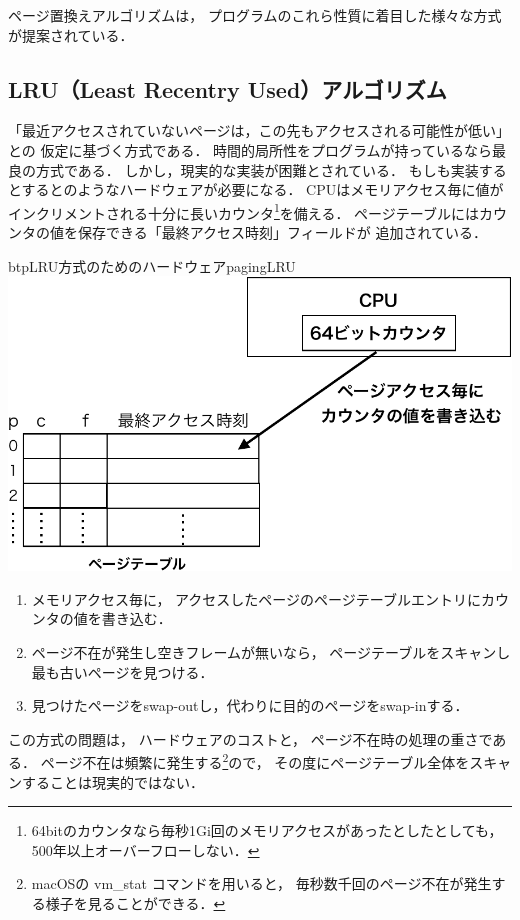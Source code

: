 ページ置換えアルゴリズムは，
プログラムのこれら性質に着目した様々な方式が提案されている．

\subsection{LRU（Least Recentry Used）アルゴリズム}
「最近アクセスされていないページは，この先もアクセスされる可能性が低い」との
仮定に基づく方式である．
時間的局所性をプログラムが持っているなら最良の方式である．
しかし，現実的な実装が困難とされている．
もしも実装するとするとのようなハードウェアが必要になる．
CPUはメモリアクセス毎に値がインクリメントされる十分に長いカウンタ\footnote{
64bitのカウンタなら毎秒1Gi回のメモリアクセスがあったとしたとしても，
500年以上オーバーフローしない．
}を備える．
ページテーブルにはカウンタの値を保存できる「最終アクセス時刻」フィールドが
追加されている．

\begin{myfig}{btp}{LRU方式のためのハードウェア}{pagingLRU}
  \includegraphics[scale=0.66]{Fig/pagingLRU-crop.pdf}
\end{myfig}

\begin{enumerate}
\item メモリアクセス毎に，
  アクセスしたページのページテーブルエントリにカウンタの値を書き込む．
\item ページ不在が発生し空きフレームが無いなら，
  ページテーブルをスキャンし最も古いページを見つける．
\item 見つけたページをswap-outし，代わりに目的のページをswap-inする．
\end{enumerate}

この方式の問題は，
ハードウェアのコストと，
ページ不在時の処理の重さである．
ページ不在は頻繁に発生する\footnote{
macOSの vm\_stat コマンドを用いると，
毎秒数千回のページ不在が発生する様子を見ることができる．}ので，
その度にページテーブル全体をスキャンすることは現実的ではない．

